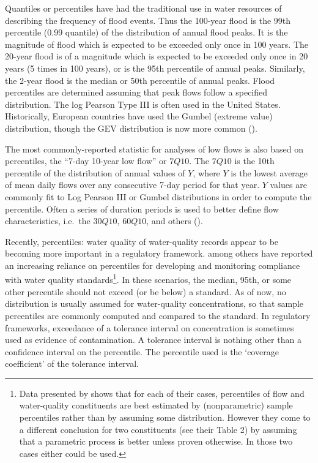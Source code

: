\documentclass[]{book}
\begin{document}
Quantiles or percentiles have had the traditional use in water resources of describing the frequency of flood events. Thus the 100-year flood is the 99th percentile (0.99 quantile) of the distribution of annual flood peaks. It is the magnitude of flood which is expected to be exceeded only once in 100 years. The 20-year flood is of a magnitude which is expected to be exceeded only once in 20 years (5 times in 100 years), or is the 95th percentile of annual peaks. Similarly, the 2-year flood is the median or 50th percentile of annual peaks. Flood percentiles are determined assuming that peak flows follow a specified distribution. The log Pearson Type III is often used in the United States. Historically, European countries have used the Gumbel (extreme value) distribution, though the GEV distribution is now more common (\citet{ponce_engineering_1989}).

The most commonly-reported statistic for analyses of low flows is also based on percentiles, the ``7-day 10-year low flow'' or \(7Q10\). The \(7Q10\) is the 10th percentile of the distribution of annual values of \(Y\), where \(Y\) is the lowest average of mean daily flows over any consecutive 7-day period for that year. \(Y\) values are commonly fit to Log Pearson III or Gumbel distributions in order to compute the percentile. Often a series of duration periods is used to better define flow characteristics, i.e.~the \(30Q10\), \(60Q10\), and others (\citet{ponce_engineering_1989}).

Recently, percentiles: water quality of water-quality records appear to be becoming more important in a regulatory framework. \citet{crabtree_percentile_1987} among others have reported an increasing reliance on percentiles for developing and monitoring compliance with water quality standards\footnote{Data presented by \citet{crabtree_percentile_1987} shows that for each of their cases, percentiles of flow and water-quality constituents are best estimated by (nonparametric) sample percentiles rather than by assuming some distribution. However they come to a different conclusion for two constituents (see their Table 2) by assuming that a parametric process is better unless proven otherwise. In those two cases either could be used.}. In these scenarios, the median, 95th, or some other percentile should not exceed (or be below) a standard. As of now, no distribution is usually assumed for water-quality concentrations, so that sample percentiles are commonly computed and compared to the standard. In regulatory frameworks, exceedance of a tolerance interval on concentration is sometimes used as evidence of contamination. A tolerance interval is nothing other than a confidence interval on the percentile. The percentile used is the `coverage coefficient' of the tolerance interval.
\end{document}
